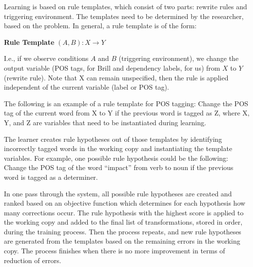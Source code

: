 Learning is based on rule templates, which consist of two parts: rewrite rules and triggering environment. The templates need to be determined by the researcher, based on the problem. In general, a rule template is of the form:


\textbf{Rule Template} ${(A, B): X \rightarrow Y} $

I.e., if we observe conditions $A$ and $B$ (triggering environment), we change the output variable (POS tags, for Brill and dependency labels, for us) 
from $X$ to $Y$ (rewrite rule). Note that X can remain unspecified, then the rule is applied independent of the current variable (label or POS tag).

The following is an example of a rule template for POS tagging: Change the POS tag of the current word from X to Y if the previous word is tagged as Z, where X, Y, and Z are variables that need to be instantiated during learning. 

The learner creates rule hypotheses out of those templates by identifying incorrectly tagged words in the working copy and instantiating the template variables.
For example, one possible rule hypothesis could be the following: Change the POS tag of the word ``impact'' from verb to noun if the previous word is tagged as a determiner. %

In one pass through the system, all possible rule hypotheses are created and ranked  based on an objective function which determines for each hypothesis how many corrections occur. The rule hypothesis with the highest score is applied to the working copy and added to the final list of transformations, stored in order, during the training process. Then the process repeats, and new rule hypotheses are generated from the templates based on the remaining errors in the working copy. The process finishes when there is no more improvement in terms of reduction of errors. %



